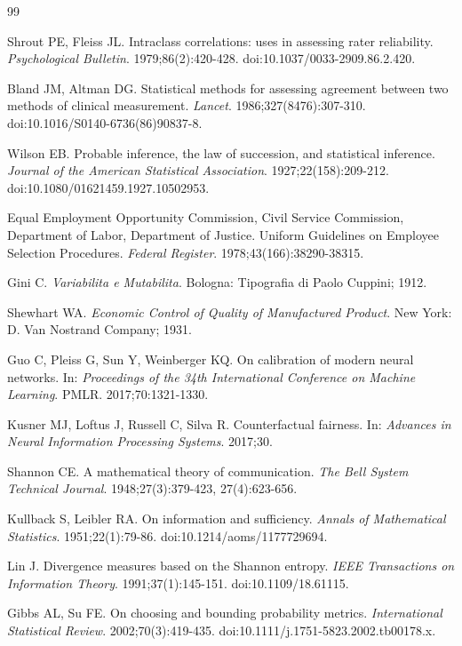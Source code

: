 \documentclass[11pt]{article}
\begin{document}
\begin{thebibliography}{99}

Shrout PE, Fleiss JL. Intraclass correlations: uses in assessing rater
reliability. \textit{Psychological Bulletin}. 1979;86(2):420-428.
doi:10.1037/0033-2909.86.2.420.

Bland JM, Altman DG. Statistical methods for assessing agreement between two
methods of clinical measurement. \textit{Lancet}. 1986;327(8476):307-310.
doi:10.1016/S0140-6736(86)90837-8.

Wilson EB. Probable inference, the law of succession, and statistical
inference. \textit{Journal of the American Statistical Association}.
1927;22(158):209-212. doi:10.1080/01621459.1927.10502953.

Equal Employment Opportunity Commission, Civil Service Commission, Department
of Labor, Department of Justice. Uniform Guidelines on Employee Selection
Procedures. \textit{Federal Register}. 1978;43(166):38290-38315.

Gini C. \textit{Variabilita e Mutabilita}. Bologna: Tipografia di Paolo
Cuppini; 1912.

Shewhart WA. \textit{Economic Control of Quality of Manufactured Product}.
New York: D. Van Nostrand Company; 1931.

Guo C, Pleiss G, Sun Y, Weinberger KQ. On calibration of modern neural
networks. In: \textit{Proceedings of the 34th International Conference on
Machine Learning}. PMLR. 2017;70:1321-1330.

Kusner MJ, Loftus J, Russell C, Silva R. Counterfactual fairness. In:
\textit{Advances in Neural Information Processing Systems}. 2017;30.

Shannon CE. A mathematical theory of communication. \textit{The Bell System
Technical Journal}. 1948;27(3):379-423, 27(4):623-656.

Kullback S, Leibler RA. On information and sufficiency. \textit{Annals of
Mathematical Statistics}. 1951;22(1):79-86.
doi:10.1214/aoms/1177729694.

Lin J. Divergence measures based on the Shannon entropy. \textit{IEEE
Transactions on Information Theory}. 1991;37(1):145-151.
doi:10.1109/18.61115.

Gibbs AL, Su FE. On choosing and bounding probability metrics.
\textit{International Statistical Review}. 2002;70(3):419-435.
doi:10.1111/j.1751-5823.2002.tb00178.x.


\end{thebibliography}
\end{document}
